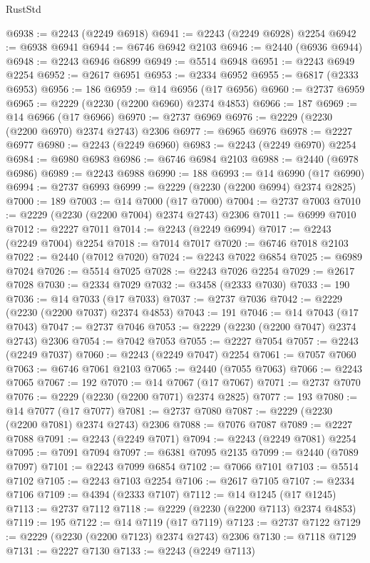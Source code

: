 \begin{lexlean}{RustStd}
\begin{coremodule}
@6938 := @2243 (@2249 @6918)
@6941 := @2243 (@2249 @6928) @2254
@6942 := @6938 @6941
@6944 := @6746 @6942 @2103
@6946 := @2440 (@6936 @6944)
@6948 := @2243 @6946 @6899
@6949 := @5514 @6948
@6951 := @2243 @6949 @2254
@6952 := @2617 @6951
@6953 := @2334 @6952
@6955 := @6817 (@2333 @6953)
@6956 := 186
@6959 := @14 @6956 (@17 @6956)
@6960 := @2737 @6959
@6965 := @2229 (@2230 (@2200 @6960) @2374 @4853)
@6966 := 187
@6969 := @14 @6966 (@17 @6966)
@6970 := @2737 @6969
@6976 := @2229 (@2230 (@2200 @6970) @2374 @2743) @2306
@6977 := @6965 @6976
@6978 := @2227 @6977
@6980 := @2243 (@2249 @6960)
@6983 := @2243 (@2249 @6970) @2254
@6984 := @6980 @6983
@6986 := @6746 @6984 @2103
@6988 := @2440 (@6978 @6986)
@6989 := @2243 @6988
@6990 := 188
@6993 := @14 @6990 (@17 @6990)
@6994 := @2737 @6993
@6999 := @2229 (@2230 (@2200 @6994) @2374 @2825)
@7000 := 189
@7003 := @14 @7000 (@17 @7000)
@7004 := @2737 @7003
@7010 := @2229 (@2230 (@2200 @7004) @2374 @2743) @2306
@7011 := @6999 @7010
@7012 := @2227 @7011
@7014 := @2243 (@2249 @6994)
@7017 := @2243 (@2249 @7004) @2254
@7018 := @7014 @7017
@7020 := @6746 @7018 @2103
@7022 := @2440 (@7012 @7020)
@7024 := @2243 @7022 @6854
@7025 := @6989 @7024
@7026 := @5514 @7025
@7028 := @2243 @7026 @2254
@7029 := @2617 @7028
@7030 := @2334 @7029
@7032 := @3458 (@2333 @7030)
@7033 := 190
@7036 := @14 @7033 (@17 @7033)
@7037 := @2737 @7036
@7042 := @2229 (@2230 (@2200 @7037) @2374 @4853)
@7043 := 191
@7046 := @14 @7043 (@17 @7043)
@7047 := @2737 @7046
@7053 := @2229 (@2230 (@2200 @7047) @2374 @2743) @2306
@7054 := @7042 @7053
@7055 := @2227 @7054
@7057 := @2243 (@2249 @7037)
@7060 := @2243 (@2249 @7047) @2254
@7061 := @7057 @7060
@7063 := @6746 @7061 @2103
@7065 := @2440 (@7055 @7063)
@7066 := @2243 @7065
@7067 := 192
@7070 := @14 @7067 (@17 @7067)
@7071 := @2737 @7070
@7076 := @2229 (@2230 (@2200 @7071) @2374 @2825)
@7077 := 193
@7080 := @14 @7077 (@17 @7077)
@7081 := @2737 @7080
@7087 := @2229 (@2230 (@2200 @7081) @2374 @2743) @2306
@7088 := @7076 @7087
@7089 := @2227 @7088
@7091 := @2243 (@2249 @7071)
@7094 := @2243 (@2249 @7081) @2254
@7095 := @7091 @7094
@7097 := @6381 @7095 @2135
@7099 := @2440 (@7089 @7097)
@7101 := @2243 @7099 @6854
@7102 := @7066 @7101
@7103 := @5514 @7102
@7105 := @2243 @7103 @2254
@7106 := @2617 @7105
@7107 := @2334 @7106
@7109 := @4394 (@2333 @7107)
@7112 := @14 @1245 (@17 @1245)
@7113 := @2737 @7112
@7118 := @2229 (@2230 (@2200 @7113) @2374 @4853)
@7119 := 195
@7122 := @14 @7119 (@17 @7119)
@7123 := @2737 @7122
@7129 := @2229 (@2230 (@2200 @7123) @2374 @2743) @2306
@7130 := @7118 @7129
@7131 := @2227 @7130
@7133 := @2243 (@2249 @7113)

\end{coremodule}
\end{lexlean}
